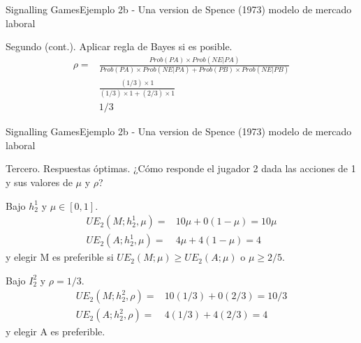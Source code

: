 \documentclass[notes, 11pt]{beamer} %
\newenvironment{wideitemize}{\itemize\addtolength{\itemsep}{10pt}}{\enditemize}
\begin{document}
\begin{frame}{Signalling Games}{Ejemplo 2b - Una version de Spence (1973) modelo de mercado laboral}
	\begin{wideitemize}
		\item<1-> Segundo (cont.). Aplicar regla de Bayes si es posible. 
		\begin{align*}
			\rho = & \frac{ Prob(PA) \times Prob(NE|PA) }{ Prob(PA)\times Prob(NE|PA) + Prob(PB)\times Prob(NE|PB) } \\
			& \frac{ (1/3) \times 1 }{ (1/3) \times 1 + (2/3) \times 1 } \\
			& 1/3
		\end{align*}
	\end{wideitemize}
\end{frame}


\begin{frame}{Signalling Games}{Ejemplo 2b - Una version de Spence (1973) modelo de mercado laboral}
	\begin{wideitemize}
		\item<1-> Tercero. Respuestas \'optimas. ¿C\'omo responde el jugador 2 dada las acciones de 1 y sus valores de $\mu$ y $\rho$? 
		\begin{wideitemize}
			\item<2->[--] Bajo $h_{2}^{1}$ y $\mu \in [0,1]$. 
			\begin{align*}
				UE_{2}(M;h_{2}^{1},\mu) = & 10\mu + 0(1-\mu) = 10\mu \\
				UE_{2}(A;h_{2}^{1},\mu) = & 4\mu + 4(1-\mu) = 4
			\end{align*} y elegir M es preferible si $UE_{2}(M;\mu) \geq UE_{2}(A;\mu)$ o $\mu \geq 2/5$.
			\item<3->[--] Bajo $I_{2}^{2}$ y $\rho = 1/3$.
			\begin{align*}
				UE_{2}(M;h_{2}^{2},\rho) = & 10(1/3) + 0(2/3) = 10/3 \\
				UE_{2}(A;h_{2}^{2},\rho) = & 4(1/3) + 4(2/3) = 4
			\end{align*} y elegir A es preferible.
		\end{wideitemize}
	\end{wideitemize}
\end{frame}
\end{document}

